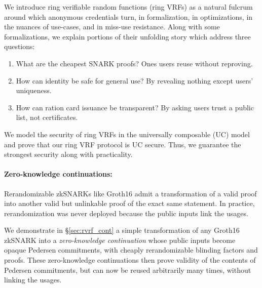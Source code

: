 
\def\qaudbreak{\eprint{\quad}{\\}}

We introduce ring verifiable random functions (ring VRFs) as a natural
fulcrum around which anonymous credentials turn, in formalization,
in optimizations, in the nuances of use-cases, and in miss-use resistance.
%
Along with some formalizations, we explain portions of their unfolding
story which address three questions:
\begin{enumerate} 
\item
What are the cheapest SNARK proofs?  \qaudbreak
Ones users reuse without reproving.
\item
How can identity be safe for general use?  \qaudbreak
By revealing nothing except users' uniqueness.
\item
How can ration card issuance be transparent?  \qaudbreak
By asking users trust a public list, not certificates.
\end{enumerate}

We model the security of ring VRFs in the universally composable (UC) \cite{canetti1,canetti2} model and  prove that our ring VRF protocol is UC secure. Thus, we guarantee the strongest security along with  practicality.
\paragraph{Zero-knowledge continuations:}

Rerandomizable zkSNARKs like Groth16 \cite{Groth16} admit a
transformation of a valid proof into another valid but unlinkable
proof of the exact same statement.  In practice, rerandomization
was never deployed because the public inputs link the usages.

We demonstrate in \S\ref{sec:rvrf_cont} a simple transformation of
any Groth16 zkSNARK into a {\it zero-knowledge continuation} whose
public inputs become opaque Pedersen commitments, with cheaply
rerandomizable blinding factors and proofs.
These zero-knowledge continuations then prove validity of the contents
of Pedersen commitments, but can now be reused arbitrarily many times,
without linking the usages. 

